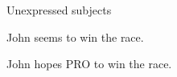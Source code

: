 \documentclass[ignorenonframetext,10pt,aspectratio=169]{beamer}
\begin{document}
\begin{frame}[t,plain]{Unexpressed subjects}

\vspace{50pt}
\hspace{60pt}John\hspace{20pt} seems\hspace{20pt} to\hspace{20pt} win\hspace{20pt} the\hspace{20pt} race.
\vspace{50pt}

\hspace{60pt}John\hspace{20pt} hopes\hspace{20pt} PRO\hspace{20pt} to\hspace{20pt} win\hspace{20pt} the\hspace{20pt} race.


\end{frame}
\begin{frame}[t,plain]{}

\end{frame}
\begin{frame}[t,plain]{}

\end{frame}
\begin{frame}[t,plain]{}

\end{frame}
\begin{frame}[t,plain]{}

\end{frame}
\end{document}
